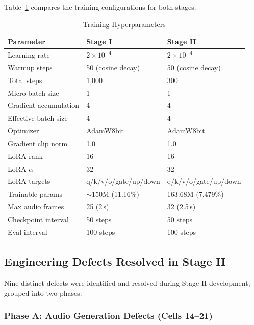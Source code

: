 \documentclass[conference]{IEEEtran}
\begin{document}
Table~\ref{tab:hparams} compares the training configurations for both stages.

\begin{table}[t]
\caption{Training Hyperparameters}
\label{tab:hparams}
\centering
\small
\begin{tabular}{@{}lll@{}}
\toprule
\textbf{Parameter} & \textbf{Stage I} & \textbf{Stage II} \\
\midrule
Learning rate & $2 \times 10^{-4}$ & $2 \times 10^{-4}$ \\
Warmup steps & 50 (cosine decay) & 50 (cosine decay) \\
Total steps & 1,000 & 300 \\
Micro-batch size & 1 & 1 \\
Gradient accumulation & 4 & 4 \\
Effective batch size & 4 & 4 \\
Optimizer & AdamW8bit & AdamW8bit \\
Gradient clip norm & 1.0 & 1.0 \\
LoRA rank & 16 & 16 \\
LoRA $\alpha$ & 32 & 32 \\
LoRA targets & q/k/v/o/gate/up/down & q/k/v/o/gate/up/down \\
Trainable params & $\sim$150M (11.16\%) & 163.68M (7.479\%) \\
Max audio frames & 25 (2\,s) & 32 (2.5\,s) \\
Checkpoint interval & 50 steps & 50 steps \\
Eval interval & 100 steps & 100 steps \\
\bottomrule
\end{tabular}
\end{table}

\subsection{Engineering Defects Resolved in Stage II}

Nine distinct defects were identified and resolved during Stage II development,
grouped into two phases:

\subsubsection{Phase A: Audio Generation Defects (Cells 14--21)}
\end{document}
